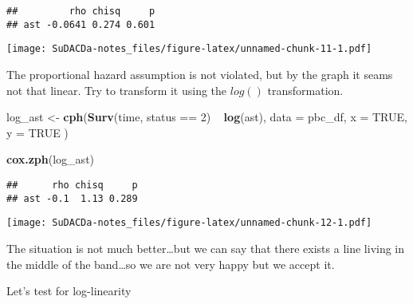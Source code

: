 \documentclass[]{book}
\newenvironment{Shaded}{\begin{snugshade}}{\end{snugshade}}
\newcommand{\KeywordTok}[1]{\textcolor[rgb]{0.13,0.29,0.53}{\textbf{{#1}}}}
\newcommand{\DataTypeTok}[1]{\textcolor[rgb]{0.13,0.29,0.53}{{#1}}}
\newcommand{\DecValTok}[1]{\textcolor[rgb]{0.00,0.00,0.81}{{#1}}}
\newcommand{\StringTok}[1]{\textcolor[rgb]{0.31,0.60,0.02}{{#1}}}
\newcommand{\OtherTok}[1]{\textcolor[rgb]{0.56,0.35,0.01}{{#1}}}
\newcommand{\NormalTok}[1]{{#1}}
\theoremstyle{definition}
\theoremstyle{definition}
\theoremstyle{definition}
\theoremstyle{remark}
\begin{document}
\begin{verbatim}
##         rho chisq     p
## ast -0.0641 0.274 0.601
\end{verbatim}

\begin{Shaded}
\end{Shaded}

\texttt{[image: SuDACDa-notes\_files/figure-latex/unnamed-chunk-11-1.pdf]}

The proportional hazard assumption is not violated, but by the graph it
seams not that linear. Try to transform it using the \(log()\)
transformation.

\begin{Shaded}
\begin{Highlighting}[]
\NormalTok{log_ast <-}\StringTok{ }\KeywordTok{cph}\NormalTok{(}\KeywordTok{Surv}\NormalTok{(time, status ==}\StringTok{ }\DecValTok{2}\NormalTok{) ~}\StringTok{ }\KeywordTok{log}\NormalTok{(ast),}
  \DataTypeTok{data =} \NormalTok{pbc_df,}
  \DataTypeTok{x    =} \OtherTok{TRUE}\NormalTok{,}
  \DataTypeTok{y    =} \OtherTok{TRUE}
\NormalTok{)}

\KeywordTok{cox.zph}\NormalTok{(log_ast)}
\end{Highlighting}
\end{Shaded}

\begin{verbatim}
##      rho chisq     p
## ast -0.1  1.13 0.289
\end{verbatim}

\begin{Shaded}
\end{Shaded}

\texttt{[image: SuDACDa-notes\_files/figure-latex/unnamed-chunk-12-1.pdf]}

The situation is not much better\ldots{}but we can say that there exists
a line living in the middle of the band\ldots{}so we are not very happy
but we accept it.

Let's test for log-linearity
\end{document}
